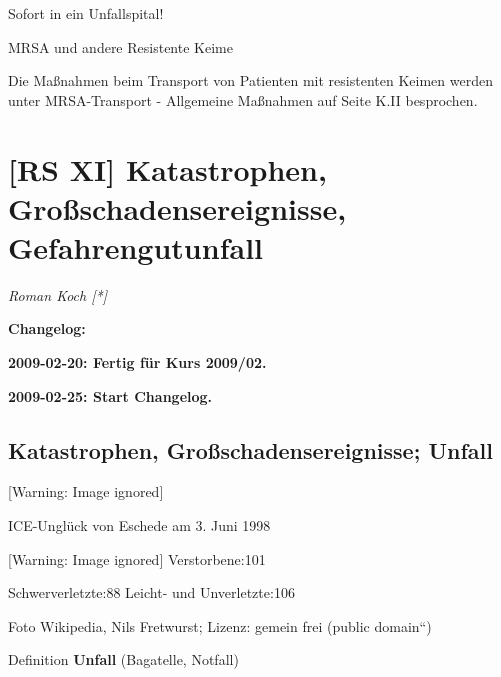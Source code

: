 \documentclass{article}
\newcommand\gEs[1]{\textbf{\textcolor[rgb]{0.0,0.0,0.5019608}{#1}}}
\newcommand\gEs[1]{\textbf{\textcolor[rgb]{0.0,0.0,0.5019608}{#1}}}
\newcommand\gT[1]{\textbf{\textup{\textcolor[rgb]{0.0,0.5019608,0.0}{#1}}}}
\begin{document}
{\mdseries\color{black}
Sofort in ein Unfallspital! }

{\mdseries\color[rgb]{0.0,0.0,0.5019608}
MRSA und andere Resistente Keime}

{\mdseries
Die Ma{\ss}nahmen beim Transport von Patienten mit resistenten Keimen
werden unter {\quotedblbase}MRSA-Transport - Allgemeine
Ma{\ss}nahmen{\quotedblbase} auf Seite
K.II{\guillemotright}\pageref{bkm:RefHeading40262819} besprochen.}

\section{[RS XI] Katastrophen, Gro{\ss}schadensereignisse,
Gefahrengutunfall}
{\mdseries\itshape
Roman Koch [*]}

{\bfseries\color[rgb]{0.5019608,0.0,0.0}
\gEs{Changelog:}}

{\bfseries\color[rgb]{0.5019608,0.0,0.0}
2009-02-20: Fertig f\"ur Kurs 2009/02.}

{\bfseries\color[rgb]{0.5019608,0.0,0.0}
2009-02-25: Start Changelog.}

\subsection{Katastrophen, Gro{\ss}schadensereignisse; Unfall}
\begin{minipage}{13.7cm}
  [Warning: Image ignored] %
 

{\mdseries\upshape
ICE-Ungl\"uck von Eschede am 3. Juni 1998}

 [Warning: Image ignored] %
{\mdseries\upshape
Verstorbene:101}

{\mdseries\upshape
Schwerverletzte:88  Leicht- und Unverletzte:106}

{\mdseries\upshape
Foto Wikipedia, Nils Fretwurst; Lizenz: gemein frei
({\quotedblbase}public domain{\textquotedblleft})}

\end{minipage}

{\mdseries\color{black}
Definition \gT{Unfall} (Bagatelle, Notfall)}
\end{document}
